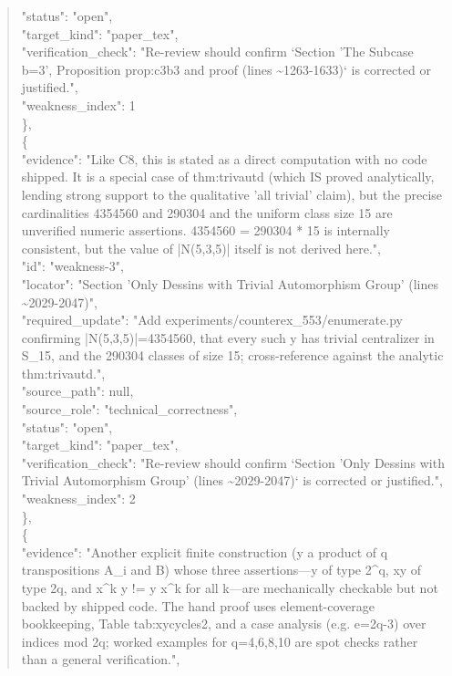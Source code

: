 \documentclass[11pt]{article}
\begin{document}
\begin{quote}
      "status": "open",\\
      "target\_kind": "paper\_tex",\\
      "verification\_check": "Re-review should confirm `Section 'The Subcase b=3', Proposition prop:c3b3 and proof (lines \~{}1263-1633)` is corrected or justified.",\\
      "weakness\_index": 1\\
    \},\\
    \{\\
      "evidence": "Like C8, this is stated as a direct computation with no code shipped. It is a special case of thm:trivautd (which IS proved analytically, lending strong support to the qualitative 'all trivial' claim), but the precise cardinalities 4354560 and 290304 and the uniform class size 15 are unverified numeric assertions. 4354560 = 290304 * 15 is internally consistent, but the value of |N(5,3,5)| itself is not derived here.",\\
      "id": "weakness-3",\\
      "locator": "Section 'Only Dessins with Trivial Automorphism Group' (lines \~{}2029-2047)",\\
      "required\_update": "Add experiments/counterex\_553/enumerate.py confirming |N(5,3,5)|=4354560, that every such y has trivial centralizer in S\_15, and the 290304 classes of size 15; cross-reference against the analytic thm:trivautd.",\\
      "source\_path": null,\\
      "source\_role": "technical\_correctness",\\
      "status": "open",\\
      "target\_kind": "paper\_tex",\\
      "verification\_check": "Re-review should confirm `Section 'Only Dessins with Trivial Automorphism Group' (lines \~{}2029-2047)` is corrected or justified.",\\
      "weakness\_index": 2\\
    \},\\
    \{\\
      "evidence": "Another explicit finite construction (y a product of q transpositions A\_i and B) whose three assertions---y of type 2\^{}q, xy of type 2q, and x\^{}k y != y x\^{}k for all k---are mechanically checkable but not backed by shipped code. The hand proof uses element-coverage bookkeeping, Table tab:xycycles2, and a case analysis (e.g. e=2q-3) over indices mod 2q; worked examples for q=4,6,8,10 are spot checks rather than a general verification.",\\

\end{quote}
\end{document}
